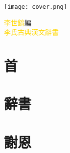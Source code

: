 \documentclass[a5paper,11pt]{report}
\begin{document}
\begin{titlepage}
\doublespacing
\hfill
\vfill
\hspace{-40mm}
\texttt{[image: cover.png]}
\vfill
\begin{flushright}
{\textcolor{gold}{李世鎬}\hspace{14pt}編\hfill}\\
\vspace{14pt}
{\huge\textcolor{gold}{李氏古典漢文辭書}}
\end{flushright}
\vfill
\end{titlepage}
\newpage
\chapter*{首}
\doublespacing


\chapter*{辭書}
\begin{multicols}{3}
\begin{flushleft}
\onehalfspacing

\end{flushleft}
\end{multicols}

\chapter*{謝恩}
\doublespacing

\end{document}
